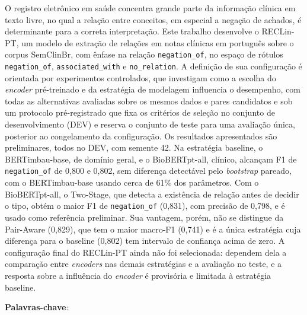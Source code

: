 \begin{resumo}
  \vspace{-15pt}

  O registro eletrônico em saúde concentra grande parte da informação clínica em
  texto livre, no qual a relação entre conceitos, em especial a negação de
  achados, é determinante para a correta interpretação. Este trabalho desenvolve o
  RECLin-PT, um modelo de extração de relações em notas clínicas em português sobre o
  corpus SemClinBr, com ênfase na relação \texttt{negation\_of}, no espaço de rótulos
  \texttt{negation\_of}, \texttt{associated\_with} e \texttt{no\_relation}. A
  definição de sua configuração é orientada por experimentos controlados, que
  investigam como a escolha do \emph{encoder} pré-treinado e da estratégia de
  modelagem influencia o desempenho, com todas as alternativas avaliadas sobre os
  mesmos dados e pares candidatos e sob um protocolo
  pré-registrado que fixa os critérios de seleção no conjunto de desenvolvimento (DEV)
  e reserva o conjunto de teste para uma avaliação única, posterior ao congelamento da
  configuração. Os resultados apresentados são preliminares, todos no DEV, com
  semente 42. Na estratégia baseline, o BERTimbau-base, de domínio geral, e o
  BioBERTpt-all, clínico, alcançam F1 de \texttt{negation\_of} de 0,800 e 0,802, sem
  diferença detectável pelo \emph{bootstrap} pareado, com o BERTimbau-base usando
  cerca de 61\% dos parâmetros. Com o BioBERTpt-all, o Two-Stage, que detecta a
  existência de relação antes de decidir o tipo, obtém o maior F1 de
  \texttt{negation\_of} (0,831), com precisão de 0,798, e é usado como referência
  preliminar. Sua vantagem, porém, não se distingue da Pair-Aware (0,829), que tem o
  maior macro-F1 (0,741) e é a única estratégia cuja diferença para o baseline (0,802)
  tem intervalo de confiança acima de zero. A configuração final do RECLin-PT ainda
  não foi selecionada: dependem dela a comparação entre \emph{encoders} nas demais
  estratégias e a avaliação no teste, e a resposta sobre a influência do
  \emph{encoder} é provisória e limitada à estratégia baseline.

  \vspace{\onelineskip}

  \noindent\textbf{Palavras-chave}: \palavraschaveemlinha
\end{resumo}

